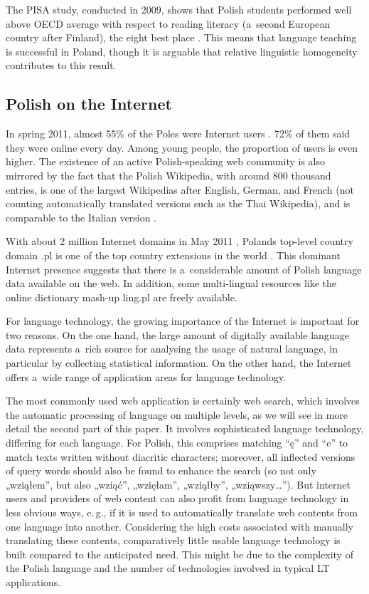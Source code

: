 \begin{multicols}{2}
The PISA study, conducted in 2009, shows that Polish students
performed well above OECD average with respect to reading literacy
(a~second European country after Finland), the eight best place
\cite{Oecd1}. This means that language teaching is successful in
Poland, though it is arguable that relative linguistic homogeneity
contributes to this result. 

\subsection{Polish on the Internet} 

In spring 2011, almost 55\% of the Poles were Internet users
\cite{Rp1}. 72\% of them said they were online every day. Among young
people, the proportion of users is even higher. The existence of an
active Polish-speaking web community is also mirrored by the fact that
the Polish Wikipedia, with around 800 thousand entries, is one of the
largest Wikipedias after English, German, and French (not counting
automatically translated versions such as the Thai Wikipedia), and is
comparable to the Italian version \cite{Wiki1}. 


With about 2 million Internet domains in May 2011 \cite{Krd1},
Poland{\textquotesingle}s top-level country domain .pl is one of the
top country extensions in the world \cite{ebrands1}. This dominant
Internet presence suggests that there is a~considerable amount of
Polish language data available on the web. In addition, some
multi-lingual resources like the online dictionary mash-up ling.pl
\cite{ling1} are freely available. 

For language technology, the growing importance of the Internet is
important for two reasons. On the one hand, the large amount of
digitally available language data represents a~rich source for
analysing the usage of natural language, in particular by collecting
statistical information. On the other hand, the Internet offers a~wide
range of application areas for language technology. 

The most commonly used web application is certainly web search, which
involves the automatic processing of language on multiple levels, as
we will see in more detail the second part of this paper. It involves
sophisticated language technology, differing for each language. For
Polish, this comprises matching “ę” and “e” to match texts
written without diacritic characters; moreover, all inflected versions
of query words should also be found to enhance the search (so not only
„wziąłem”, but also „wziąć”, „wzięłam”,
„wziąłby”, „wziąwszy…”). But internet users and providers
of web content can also profit from language technology in less
obvious ways, e.\,g., if it is used to automatically translate web
contents from one language into another. Considering the high costs
associated with manually translating these contents, comparatively
little usable language technology is built compared to the anticipated
need. This might be due to the complexity of the Polish language and
the number of technologies involved in typical LT applications. 


\end{multicols}
